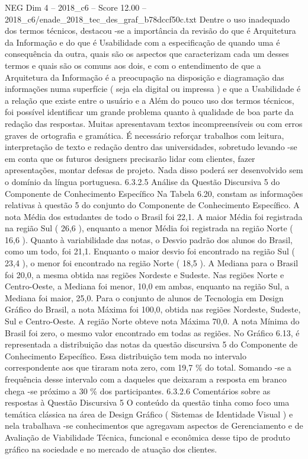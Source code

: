 \begin{textsample}{NEG Dim 4 – 2018\_c6 – Score 12.00 – 2018\_c6/enade\_2018\_tec\_des\_graf\_b78dccf50c.txt}
Dentre o uso inadequado dos termos técnicos, destacou -se a importância da revisão do que é Arquitetura da Informação e do que é Usabilidade com a especificação de quando uma é consequência da outra, quais são os aspectos que caracterizam cada um desses termos e quais são os comuns aos dois, e com o entendimento de que a Arquitetura da Informação é a preocupação na disposição e diagramação das informações numa superfície ( seja ela digital ou impressa ) e que a Usabilidade é a relação que existe entre o usuário e a Além do pouco uso dos termos técnicos, foi possível identificar um grande problema quanto à qualidade de boa parte da redação das respostas.
Muitas apresentavam textos incompreensíveis ou com erros graves de ortografia e gramática.
É necessário reforçar trabalhos com leitura, interpretação de texto e redação dentro das universidades, sobretudo levando -se em conta que os futuros designers precisarão lidar com clientes, fazer apresentações, montar defesas de projeto.
Nada disso poderá ser desenvolvido sem o domínio da língua portuguesa. 6.3.2.5 Análise da Questão Discursiva 5 do Componente de Conhecimento Específico Na Tabela 6.20, constam as informações relativas à questão 5 do conjunto do Componente de Conhecimento Específico.
A nota Média dos estudantes de todo o Brasil foi 22,1.
A maior Média foi registrada na região Sul ( 26,6 ), enquanto a menor Média foi registrada na região Norte ( 16,6 ).
Quanto à variabilidade das notas, o Desvio padrão dos alunos do Brasil, como um todo, foi 21,1.
Enquanto o maior desvio foi encontrado na região Sul ( 23,4 ), o menor foi encontrado na região Norte ( 18,5 ).
A Mediana para o Brasil foi 20,0, a mesma obtida nas regiões Nordeste e Sudeste.
Nas regiões Norte e Centro-Oeste, a Mediana foi menor, 10,0 em ambas, enquanto na região Sul, a Mediana foi maior, 25,0.
Para o conjunto de alunos de Tecnologia em Design Gráfico do Brasil, a nota Máxima foi 100,0, obtida nas regiões Nordeste, Sudeste, Sul e Centro-Oeste.
A região Norte obteve nota Máxima 70,0.
A nota Mínima do Brasil foi zero, o mesmo valor encontrado em todas as regiões.
No Gráfico 6.13, é representada a distribuição das notas da questão discursiva 5 do Componente de Conhecimento Específico.
Essa distribuição tem moda no intervalo correspondente aos que tiraram nota zero, com 19,7 \% do total.
Somando -se a frequência desse intervalo com a daqueles que deixaram a resposta em branco chega -se próximo a 30 \% dos participantes. 6.3.2.6 Comentários sobre as respostas à Questão Discursiva 5 O conteúdo da questão tinha como foco uma temática clássica na área de Design Gráfico ( Sistemas de Identidade Visual ) e nela trabalhava -se conhecimentos que agregavam aspectos de Gerenciamento e de Avaliação de Viabilidade Técnica, funcional e econômica desse tipo de produto gráfico na sociedade e no mercado de atuação dos clientes.

\end{textsample}
